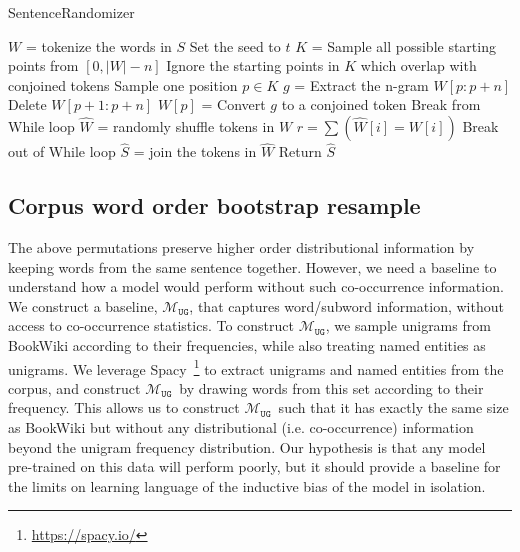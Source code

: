\documentclass[letterpaper, 12pt]{report}
\newcommand{\RC}{$\mathcal{M}_{\texttt{UG}}$}
\begin{document}


\begin{algorithm}
\small
\caption{SentenceRandomizer}
\begin{algorithmic}[1]

       
    \State $W$ = tokenize the words in $S$
    \State Set the seed to $t$
        \State $K$ = Sample all possible starting points from $[0, |W| - n]$
        \State Ignore the starting points in $K$ which overlap with conjoined tokens  
        \State Sample one position $p \in K$
        \State $g$ = Extract the n-gram $W[p:p+n]$
        \State Delete $W[p+1:p+n]$
        \State $W[p]$ = Convert $g$ to a conjoined token
        \Else
        \State Break from While loop
        \EndIf
        \EndWhile
    \EndIf
        \State $\hat{W}$ = randomly shuffle tokens in $W$
        \State $r = \sum(\hat{W}[i] = W[i])$ 
            Break out of While loop
        \EndIf
    \EndWhile
    \State $\hat{S}$ = join the tokens in $\hat{W}$
    \State Return $\hat{S}$
\EndProcedure

\end{algorithmic}
\label{algo:randomize}
\end{algorithm}



\subsection{Corpus word order bootstrap resample}

The above permutations preserve higher order distributional information by keeping words from the same sentence together. However, we need a baseline to understand how a model would perform without such co-occurrence information.
We construct a baseline, \RC{}, that captures word/subword information, without access to co-occurrence statistics.
To construct \RC, we sample unigrams from BookWiki according to their frequencies, while also treating named entities as unigrams. We leverage Spacy~\citep{spacy}\footnote{\href{https://spacy.io/}{https://spacy.io/}} to extract unigrams and named entities from the corpus, and construct \RC\ by drawing words from this set according to their frequency.
This allows us to construct \RC\ such that it has exactly the same size as BookWiki but without any distributional (i.e. co-occurrence) information beyond the unigram frequency distribution. Our hypothesis is that any model pre-trained on this data will perform poorly, but it should provide a baseline for the limits on learning language of the inductive bias of the model in isolation.
\end{document}
